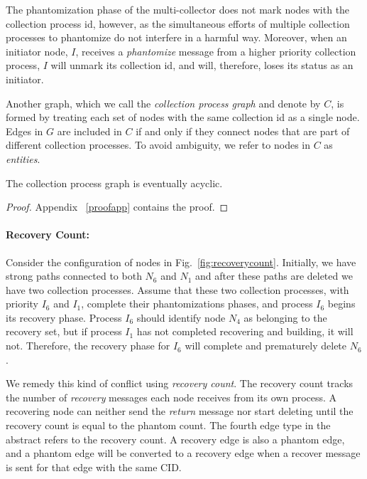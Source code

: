 The phantomization phase of the multi-collector does not mark nodes with the
collection process id, however, as the simultaneous efforts of multiple
collection processes to phantomize do not interfere in a harmful way.
Moreover, when an initiator node, $I$, receives a \emph{phantomize} message from a higher
priority collection process, $I$ will unmark its collection id, and will,
therefore, loses its status as an initiator.

Another graph, which we call the \emph{collection process graph} and denote by  $C$, is formed
by treating each set of nodes with the same collection id as a single node.
Edges in $G$ are included in $C$ if and only if they connect nodes that are part
of different collection processes.
To avoid ambiguity,
we refer to nodes in $C$ as \emph{entities}.

\begin{lemma}
The collection process graph is eventually acyclic.
\label{lem:acyclic}
\end{lemma}
\begin{proof}
Appendix ~\ref{proofapp} contains the proof.
\end{proof}

\paragraph{Recovery Count:}
Consider the configuration of nodes in Fig.~\ref{fig:recoverycount}.
Initially, we have strong paths connected to both $N_6$ and $N_1$
and after these paths are deleted we have two collection processes. Assume that these two collection processes,
with priority $I_6$ and $I_1$, complete their phantomizations phases, and process $I_6$ begins its
recovery phase. Process $I_6$ should identify node $N_4$ as belonging to the recovery set,
but if process $I_1$ has not completed recovering and building,  it will not. Therefore, the recovery phase for
$I_6$ will complete and prematurely delete $N_6$.

We remedy this kind of conflict using {\em recovery count}. %
The recovery
count tracks the number of \emph{recovery} messages each node receives from its
own process. A recovering node can neither send the
\emph{return} message nor start deleting until
the recovery count is equal to the phantom count. The fourth edge type in 
the abstract refers to the recovery count. A recovery edge is also a phantom edge,
and a phantom edge will be converted to a recovery edge when a recover message is
sent for that edge with the same CID.

